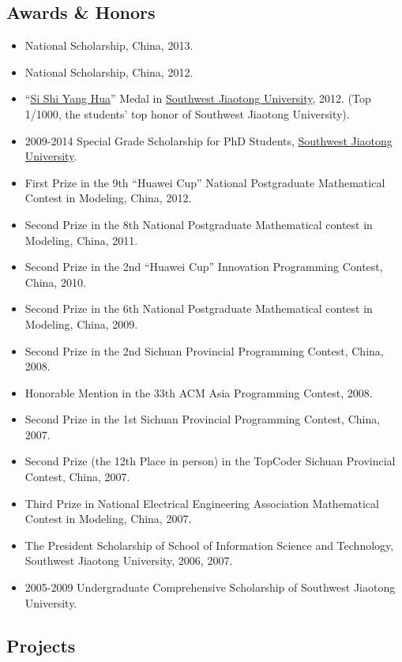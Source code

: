 \documentclass[]{article}
\begin{document}
\subsection{Awards \& Honors}\label{awards-honors}

\begin{itemize}
\itemsep1pt\parskip0pt
\item
  National Scholarship, China, 2013.
\item
  National Scholarship, China, 2012.
\item
  ``\href{http://baike.baidu.com/view/644025.htm}{Si Shi Yang Hua}''
  Medal in \href{http://www.swjtu.edu.cn/}{Southwest Jiaotong
  University}, 2012. (Top 1/1000, the students' top honor of Southwest
  Jiaotong University).
\item
  2009-2014 Special Grade Scholarship for PhD Students,
  \href{http://www.swjtu.edu.cn/}{Southwest Jiaotong University}.
\item
  First Prize in the 9th ``Huawei Cup'' National Postgraduate
  Mathematical Contest in Modeling, China, 2012.
\item
  Second Prize in the 8th National Postgraduate Mathematical contest in
  Modeling, China, 2011.
\item
  Second Prize in the 2nd ``Huawei Cup'' Innovation Programming Contest,
  China, 2010.
\item
  Second Prize in the 6th National Postgraduate Mathematical contest in
  Modeling, China, 2009.
\item
  Second Prize in the 2nd Sichuan Provincial Programming Contest, China,
  2008.
\item
  Honorable Mention in the 33th ACM Asia Programming Contest, 2008.
\item
  Second Prize in the 1st Sichuan Provincial Programming Contest, China,
  2007.
\item
  Second Prize (the 12th Place in person) in the TopCoder Sichuan
  Provincial Contest, China, 2007.
\item
  Third Prize in National Electrical Engineering Association
  Mathematical Contest in Modeling, China, 2007.
\item
  The President Scholarship of School of Information Science and
  Technology, Southwest Jiaotong University, 2006, 2007.
\item
  2005-2009 Undergraduate Comprehensive Scholarship of Southwest
  Jiaotong University.
\end{itemize}

\subsection{Projects}\label{projects}
\end{document}
